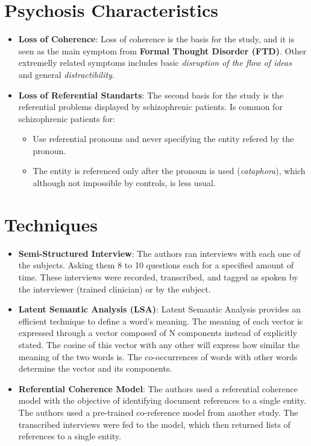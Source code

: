 \documentclass{Paper_Summary}
\begin{document}
\section{Psychosis Characteristics}
    \begin{itemize}
        \item \textbf{Loss of Coherence}: Loss of coherence is the basis for the study, and it is seen as the main symptom from \textbf{Formal Thought Disorder (FTD)}. Other extremelly related symptoms includes basic \emph{disruption of the flow of ideas} and general \emph{distractibility}.
        \item \textbf{Loss of Referential Standarts}: The second basis for the study is the referential problems displayed by schizophrenic patients. Is common for schizophrenic patients for:
        \begin{itemize}
            \item Use referential pronouns and never specifying the entity refered by the pronoun.
            \item The entity is referenced only after the pronoun is used (\emph{cataphora}), which although not impossible by controls, is less usual.
        \end{itemize}
    \end{itemize}

\section{Techniques}
    \begin{itemize}
        \item \textbf{Semi-Structured Interview}: The authors ran interviews with each one of the subjects. Asking them 8 to 10 questions each for a specified amount of time. These interviews were recorded, transcribed, and tagged as spoken by the interviewer (trained clinician) or by the subject.
        \item \textbf{Latent Semantic Analysis (LSA)}: Latent Semantic Analysis provides an efficient technique to define a word's meaning. The meaning of each vector is expressed through a vector composed of N components instead of explicitly stated. The cosine of this vector with any other will express how similar the meaning of the two words is. The co-occurrences of words with other words determine the vector and its components.
        \item \textbf{Referential Coherence Model}: The authors used a referential coherence model with the objective of identifying document references to a single entity. The authors used a pre-trained co-reference model from another study. The transcribed interviews were fed to the model, which then returned lists of references to a single entity.
    \end{itemize}
\end{document}
